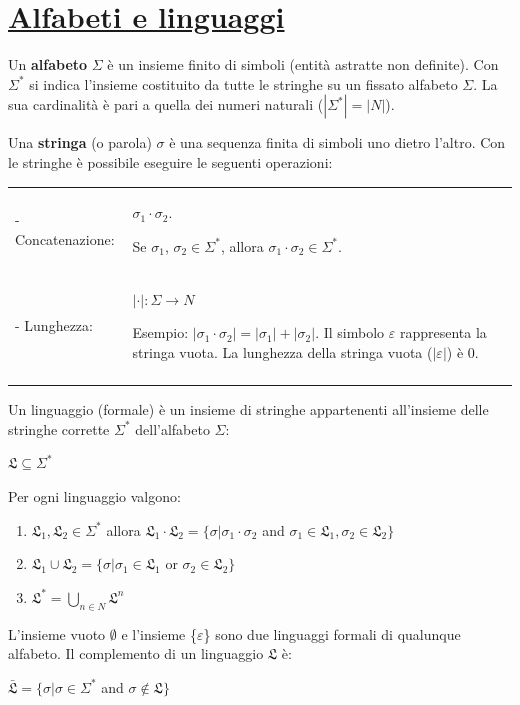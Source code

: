 \documentclass[a4paper, 10pt]{report}
\begin{document}
\section*{\underline{Alfabeti e linguaggi}}
Un \textbf{alfabeto} $\Sigma$ è un insieme finito di simboli (entità astratte non definite). Con $\Sigma^*$ si indica l'insieme costituito da tutte le stringhe su un fissato alfabeto $\Sigma$. La sua cardinalità è pari a quella dei numeri naturali ($|\Sigma^*| = |N|$).

Una \textbf{stringa} (o parola) $\sigma$ è una sequenza finita di simboli uno dietro l’altro. Con le stringhe è possibile eseguire le seguenti operazioni:\\

\begin{tabular}{lp{}}
 - Concatenazione: & $\sigma_1 \cdot \sigma_2$. 

Se $\sigma_1$, $\sigma_2 \in \Sigma^*$, allora $\sigma_1 \cdot \sigma_2 \in \Sigma^*$.\\
 - Lunghezza: & $|\cdot| : \Sigma \rightarrow N$

Esempio: $|\sigma_1 \cdot \sigma_2| = |\sigma_1| + |\sigma_2|$. Il simbolo $\varepsilon$ rappresenta la stringa vuota. La lunghezza della stringa vuota ($|\varepsilon|$) è 0.\\\\
\end{tabular}

Un linguaggio (formale) è un insieme di stringhe appartenenti all'insieme delle stringhe corrette $\Sigma^*$ dell'alfabeto $\Sigma$:
\begin{center}
$\mathfrak{L} \subseteq \Sigma^*$ 
\end{center}
Per ogni linguaggio valgono:
\begin{enumerate}
\item $\mathfrak{L}_1, \mathfrak{L}_2 \in \Sigma^*$ 
allora $ \mathfrak{L}_1 \cdot \mathfrak{L}_2 = 
\{ \sigma | \sigma_1 \cdot \sigma_2$ and $\sigma_1 \in \mathfrak{L}_1, \sigma_2 \in \mathfrak{L}_2 \}$ 
\item $\mathfrak{L}_1 \cup \mathfrak{L}_2 = \{ \sigma | \sigma_1 \in \mathfrak{L}_1$ or $\sigma_2 \in \mathfrak{L}_2 \}$ 
\item $\mathfrak{L}^* = \bigcup_{n \in N} \mathfrak{L}^n$
\end{enumerate}


L’insieme vuoto $\emptyset$ e l’insieme \{$\varepsilon$\} sono due linguaggi formali di qualunque alfabeto. Il complemento di un linguaggio $\mathfrak{L}$ è:
\begin{center}
$\bar{\mathfrak{L}} = \{\sigma | \sigma \in \Sigma^* $ and $ \sigma \notin \mathfrak{L} \}$
\end{center}
\end{document}
